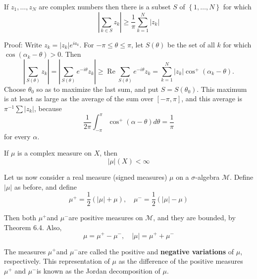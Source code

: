 \documentclass[12pt, a4paper, oneside]{book}
\begin{document}
\begin{lemma}
    If $z_{1}, \ldots, z_{N}$ are complex numbers then there is a subset $S$ of $\left\{1, \ldots, N\right\}$ for which
    $$
        \left|\sum_{k \in S} z_{k}\right| \geq \frac{1}{\pi} \sum_{k=1}^{N}\left|z_{k}\right|
    $$

    Proof:
    Write $z_{k}=\left|z_{k}\right| e^{i a_k}$. For $-\pi \leq \theta \leq \pi$, let $S(\theta)$ be the set of all $k$ for which $\cos \left(\alpha_{k}-\theta\right)>0$. Then
    $$
        \left|\sum_{S(\theta)} z_{k}\right|=\left|\sum_{S(\theta)} e^{-i \theta} z_{k}\right| \geq \operatorname{Re} \sum_{S(\theta)} e^{-i \theta} z_{k}=\sum_{k=1}^{N}\left|z_{k}\right| \cos ^{+}\left(\alpha_{k}-\theta\right) .
    $$
    Choose $\theta_{0}$ so as to maximize the last sum, and put $S=S\left(\theta_{0}\right)$. This maximum is at least as large as the average of the sum over $[-\pi, \pi]$, and this average is $\pi^{-1} \sum\left|z_{k}\right|$, because
    $$
        \frac{1}{2 \pi} \int_{-\pi}^{\pi} \cos ^{+}(\alpha-\theta) d \theta=\frac{1}{\pi}
    $$
    for every $\alpha$.
\end{lemma}
\begin{theorem}
    If $\mu$ is a complex measure on $X$, then
    $$
        \left|\mu\right|(X)<\infty
    $$
\end{theorem}
\begin{definition}
    Let us now consider a real measure (signed measures) $\mu$ on a $\sigma$-algebra $\mathcal{M}$. Define $|\mu|$ as before, and define
    \begin{equation*}
        \mu^{+}=\frac{1}{2}(|\mu|+\mu), \quad \mu^{-}=\frac{1}{2}(|\mu|-\mu)
    \end{equation*}

    Then both $\mu^{+}$and $\mu^{-}$are positive measures on $\mathcal{M}$, and they are bounded, by Theorem 6.4. Also,
    $$
        \mu=\mu^{+}-\mu^{-}, \quad|\mu|=\mu^{+}+\mu^{-}
    $$

    The measures $\mu^{+}$and $\mu^{-}$are called the positive and \textbf{negative variations} of $\mu$, respectively. This representation of $\mu$ as the difference of the positive measures $\mu^{+}$ and $\mu^{-}$is known as the Jordan decomposition of $\mu$.
\end{definition}
\end{document}
